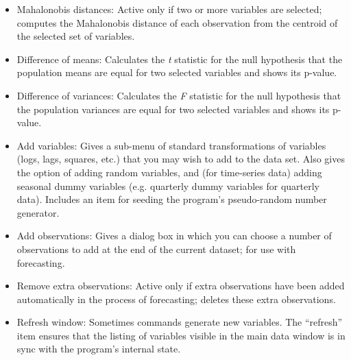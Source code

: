 \begin{itemize}
\begin{itemize}
  \item \textsf{Mahalonobis distances}: Active only if two or more
    variables are selected; computes the Mahalonobis distance of each
    observation from the centroid of the selected set of variables.
	      
  \item \textsf{Difference of means}: Calculates the \emph{t}
    statistic for the null hypothesis that the population means are
    equal for two selected variables and shows its p-value.
  \item \textsf{Difference of variances}: Calculates the \emph{F}
    statistic for the null hypothesis that the population variances
    are equal for two selected variables and shows its p-value.
  \item \textsf{Add variables}: Gives a sub-menu of standard
    transformations of variables (logs, lags, squares, etc.) that you
    may wish to add to the data set. Also gives the option of adding
    random variables, and (for time-series data) adding seasonal dummy
    variables (e.g. quarterly dummy variables for quarterly data).
    Includes an item for seeding the program's pseudo-random number
    generator.
  \item \textsf{Add observations}: Gives a dialog box in which you can
    choose a number of observations to add at the end of the current
    dataset; for use with forecasting.
	    
  \item \textsf{Remove extra observations}: Active only if extra
    observations have been added automatically in the process of
    forecasting; deletes these extra observations.
	    
  \item \textsf{Refresh window}: Sometimes  commands
    generate new variables.  The ``refresh'' item ensures that the
    listing of variables visible in the main data window is in sync
    with the program's internal state.
  \end{itemize}



\end{itemize}

